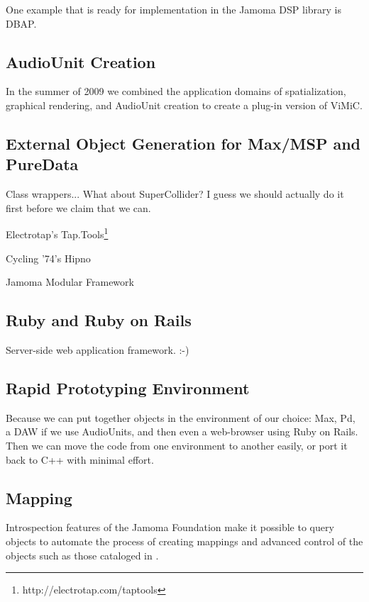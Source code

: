 \documentclass[twoside,10pt]{article}
\begin{document}
One example that is ready for implementation in the Jamoma DSP library is DBAP\cite{Lossius:2009}.


\subsection{AudioUnit Creation}

In the summer of 2009 we combined the application domains of spatialization, graphical rendering, and AudioUnit creation to create a plug-in version of ViMiC\cite{Peters:2008b}.



\subsection{External Object Generation for Max/MSP and PureData}

Class wrappers...  What about SuperCollider?  I guess we should actually do it first before we claim that we can.

Electrotap's Tap.Tools\footnote{http://electrotap.com/taptools}

Cycling '74's Hipno\cite{Place:2005}

Jamoma Modular Framework\cite{Place:2006}


\subsection{Ruby and Ruby on Rails}

Server-side web application framework.  :-)

\subsection{Rapid Prototyping Environment}

Because we can put together objects in the environment of our choice: Max, Pd, a DAW if we use AudioUnits, and then even a web-browser using Ruby on Rails.  Then we can move the code from one environment to another easily, or port it back to C++ with minimal effort.

\subsection{Mapping}

Introspection features of the Jamoma Foundation make it possible to query objects to automate the process of creating mappings and advanced control of the objects such as those cataloged in \cite{Pendharkar:2006}.  
\end{document}
